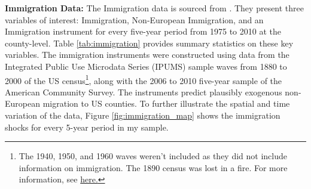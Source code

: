 {\large\textbf{Immigration Data:}} 
The Immigration data is sourced from \cite{ImmigrationInnovationGrowth}. They present three variables of interest: Immigration, Non-European Immigration, and an Immigration instrument for every five-year period from 1975 to 2010 at the county-level. Table \ref{tab:immigration} provides summary statistics on these key variables. The immigration instruments were constructed using data from the Integrated Public Use Microdata Series (IPUMS) sample waves from 1880 to 2000 of the US census\footnote{The 1940, 1950, and 1960 waves weren't included as they did not include information on immigration. The 1890 census was lost in a fire. For more information, see \href{https://www.familysearch.org/en/blog/what-happened-to-the-1890-us-census}{\textcolor{accentblue}{here.}}}, along with the 2006 to 2010 five-year sample of the American Community Survey. The instruments predict plausibly exogenous non-European migration to US counties. To further illustrate the spatial and time variation of the data, Figure \ref{fig:immigration_map} shows the immigration shocks for every 5-year period in my sample.

